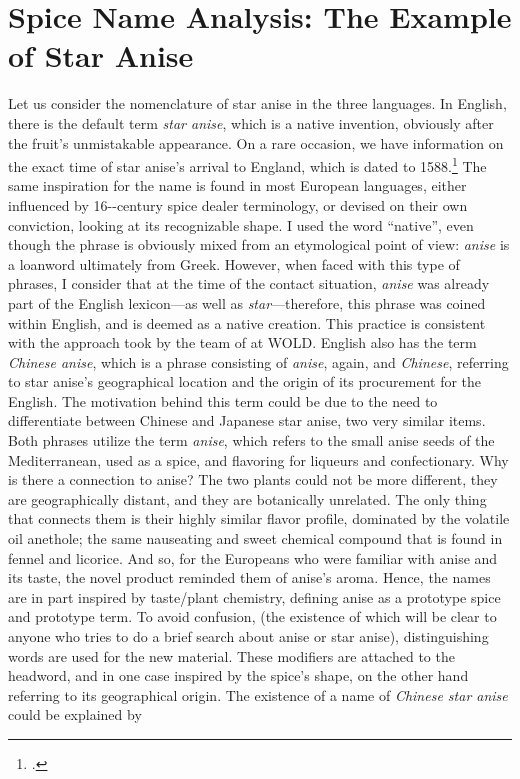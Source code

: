 




\section{Spice Name Analysis: The Example of Star Anise}
\label{sec:case_star_anise}

Let us consider the nomenclature of star anise in the three languages. In English, there is the default term \textit{star anise}, which is a native invention, obviously after the fruit's unmistakable appearance. On a rare occasion, we have information on the exact time of star anise's arrival to England, which is dated to 1588.\footcite[star anise]{oed} The same inspiration for the name is found in most European languages, either influenced by 16--century spice dealer terminology, or devised on their own conviction, looking at its recognizable shape. I used the word ``native'', even though the phrase is obviously mixed from an etymological point of view: \textit{anise} is a loanword ultimately from Greek. However, when faced with this type of phrases, I consider that at the time of the contact situation, \textit{anise} was already part of the English lexicon---as well as \textit{star}---therefore, this phrase was coined within English, and is deemed as a native creation. This practice is consistent with the approach took by the team of \textcite{wold} at \gls{WOLD}. English also has the term \textit{Chinese anise}, which is a phrase consisting of \textit{anise}, again, and \textit{Chinese}, referring to star anise's geographical location and the origin of its procurement for the English. The motivation behind this term could be due to the need to differentiate between Chinese and Japanese star anise, two very similar items. Both phrases utilize the term \textit{anise}, which refers to the small anise seeds of the Mediterranean, used as a spice, and flavoring for liqueurs and confectionary. Why is there a connection to anise? The two plants could not be more different, they are geographically distant, and they are botanically unrelated. The only thing that connects them is their highly similar flavor profile, dominated by the volatile oil anethole; the same nauseating and sweet chemical compound that is found in fennel and licorice. And so, for the Europeans who were familiar with anise and its taste, the novel product reminded them of anise's aroma. Hence, the names are in part inspired by taste/plant chemistry, defining anise as a prototype spice and prototype term. To avoid confusion, (the existence of which will be clear to anyone who tries to do a brief search about anise or star anise), distinguishing words are used for the new material. These modifiers are attached to the headword, and in one case inspired by the spice's shape, on the other hand referring to its geographical origin. The existence of a name of \textit{Chinese star anise} could be explained by 